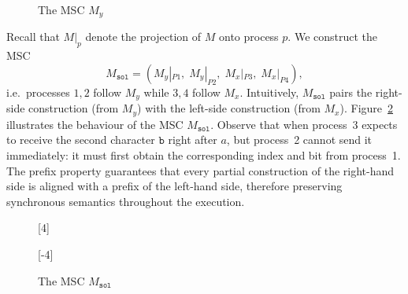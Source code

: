 \begin{example}
\begin{figure}[!ht]
\centering
\begin{msc}[draw frame=none, draw head=none, msc keyword=, head height=0px, label distance=0.5ex, foot height=0px, foot distance=0px]{}



\end{msc}
\caption{The MSC $M_y$}
\label{fig:exmp-my}
\end{figure}

Recall that $M|_p$ denote the projection of $M$ onto process $p$. We
construct the MSC
$$
  M_{\texttt{sol}} = (M_y|_{P1},\; M_y|_{P2},\; M_x|_{P3},\; M_x|_{P4}),
$$
i.e.\ processes $1,2$ follow $M_y$ while $3,4$ follow $M_x$.
Intuitively, $M_{\texttt{sol}}$ pairs the right-side construction (from $M_y$)
with the left-side construction (from $M_x$). 
Figure~\ref{fig:exmp-msol} illustrates the behaviour of the MSC
$M_{\texttt{sol}}$. Observe that when process~3 expects to receive the
second character $\texttt{b}$ right after $a$, 
but process~2 cannot send it immediately:
it must first obtain the corresponding index and bit from process~1.
The prefix property guarantees
that every partial construction of the right-hand side is aligned with
a prefix of the left-hand side, therefore preserving synchronous
semantics throughout the execution.

\begin{figure}[!ht]
\centering
\begin{msc}[draw frame=none, draw head=none, msc keyword=, head height=0px, label distance=0.5ex, foot height=0px, foot distance=0px]{}

	\nextlevel

	\nextlevel
	[-4]
	\nextlevel
	
\end{msc}
\caption{The MSC $M_\texttt{sol}$}
\label{fig:exmp-msol}
\end{figure}

\end{example}

